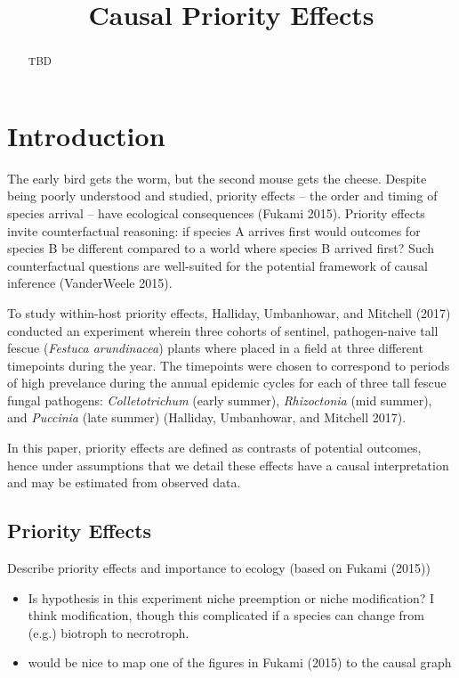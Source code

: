 \documentclass[]{article}
\title{Causal Priority Effects}
\author{}
\date{}
\providecommand{\tightlist}{%
  \setlength{\itemsep}{0pt}\setlength{\parskip}{0pt}}
\begin{document}
\maketitle
\begin{abstract}
TBD
\end{abstract}

\hypertarget{introduction}{%
\section{Introduction}\label{introduction}}

The early bird gets the worm, but the second mouse gets the cheese.
Despite being poorly understood and studied, priority effects -- the
order and timing of species arrival -- have ecological consequences
(Fukami 2015). Priority effects invite counterfactual reasoning: if
species A arrives first would outcomes for species B be different
compared to a world where species B arrived first? Such counterfactual
questions are well-suited for the potential framework of causal
inference (VanderWeele 2015).

To study within-host priority effects, Halliday, Umbanhowar, and
Mitchell (2017) conducted an experiment wherein three cohorts of
sentinel, pathogen-naive tall fescue (\emph{Festuca arundinacea}) plants
where placed in a field at three different timepoints during the year.
The timepoints were chosen to correspond to periods of high prevelance
during the annual epidemic cycles for each of three tall fescue fungal
pathogens: \emph{Colletotrichum} (early summer), \emph{Rhizoctonia} (mid
summer), and \emph{Puccinia} (late summer) (Halliday, Umbanhowar, and
Mitchell 2017).

In this paper, priority effects are defined as contrasts of potential
outcomes, hence under assumptions that we detail these effects have a
causal interpretation and may be estimated from observed data.

\hypertarget{priority-effects}{%
\subsection{Priority Effects}\label{priority-effects}}

Describe priority effects and importance to ecology (based on Fukami
(2015))

\begin{itemize}
\tightlist
\item
  Is hypothesis in this experiment niche preemption or niche
  modification? I think modification, though this complicated if a
  species can change from (e.g.) biotroph to necrotroph.
\item
  would be nice to map one of the figures in Fukami (2015) to the causal
  graph
\end{itemize}
\end{document}
